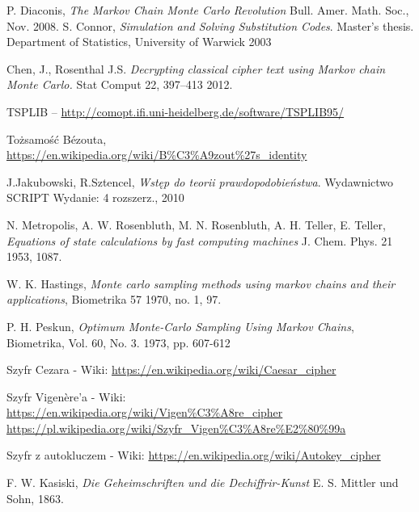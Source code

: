\documentclass[a4paper]{article}
\theoremstyle{defn}
\theoremstyle{theorem}
\theoremstyle{lemma}
\theoremstyle{cor}
\theoremstyle{fact}
\begin{document}
\newpage
\begin{thebibliography}{9}
P. Diaconis, \emph{The Markov Chain Monte Carlo Revolution}
 Bull. Amer. Math. Soc., Nov.
2008.
S. Connor,
\emph{Simulation and Solving Substitution Codes}. Master's thesis.  Department of Statistics, University of Warwick 2003

Chen, J., Rosenthal J.S. \emph{Decrypting classical cipher text using Markov chain Monte Carlo.} Stat Comput 22, 397–413 2012.

TSPLIB –
\href{http://comopt.ifi.uni-heidelberg.de/software/TSPLIB95/}{http://comopt.ifi.uni-heidelberg.de/software/TSPLIB95/}

Tożsamość Bézouta,\\
\href{https://en.wikipedia.org/wiki/B\%C3\%A9zout\%27s\_identity}{https://en.wikipedia.org/wiki/B\%C3\%A9zout\%27s\_identity}

J.Jakubowski, R.Sztencel, \emph{Wstęp do teorii prawdopodobieństwa}. Wydawnictwo SCRIPT Wydanie: 4 rozszerz., 2010

N. Metropolis, A. W. Rosenbluth, M. N. Rosenbluth, A. H. Teller, E. Teller, \emph{Equations of state calculations by fast computing machines}  J. Chem. Phys. 21 1953, 1087.

W. K. Hastings, \emph{Monte carlo sampling methods using markov chains and
their applications}, Biometrika 57 1970, no. 1, 97.

P. H. Peskun, \emph{Optimum Monte-Carlo Sampling Using Markov Chains},  Biometrika, Vol. 60, No. 3. 1973, pp. 607-612

Szyfr Cezara - Wiki:
\href{https://en.wikipedia.org/wiki/Caesar_cipher}{https://en.wikipedia.org/wiki/Caesar\_cipher}

Szyfr Vigenère'a - Wiki:\\
\href{https://en.wikipedia.org/wiki/Vigen\%C3\%A8re\_cipher}{https://en.wikipedia.org/wiki/Vigen\%C3\%A8re\_cipher}\\
\href{https://pl.wikipedia.org/wiki/Szyfr_Vigen\%C3\%A8re\%E2\%80\%99a}{https://pl.wikipedia.org/wiki/Szyfr\_Vigen\%C3\%A8re\%E2\%80\%99a}

Szyfr z autokluczem - Wiki:
\href{https://en.wikipedia.org/wiki/Autokey\_cipher}{https://en.wikipedia.org/wiki/Autokey\_cipher}

F. W. Kasiski, \emph{Die Geheimschriften und die Dechiffrir-Kunst} E. S. Mittler und Sohn, 1863.


\end{thebibliography}
\end{document}
